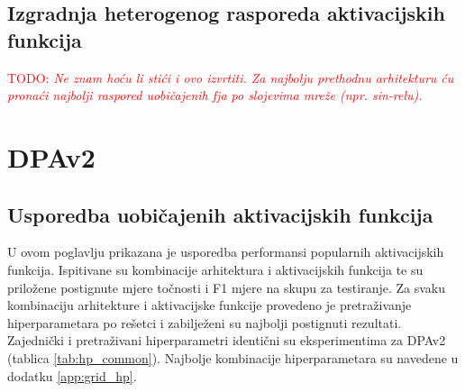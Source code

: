 \documentclass[times, utf8, numeric, diplomski]{fer}
\def\TODO#1{\noindent\textcolor{red}{TODO: \textit{#1}}\newline}
\def\todo#1{\TODO{#1}}
\begin{document}
\subsection{Izgradnja heterogenog rasporeda aktivacijskih funkcija}
\todo{Ne znam hoću li stići i ovo izvrtiti. Za najbolju prethodnu arhitekturu ću pronaći najbolji raspored uobičajenih fja po slojevima mreže (npr. sin-relu).}

\section{DPAv2}

\subsection{Usporedba uobičajenih aktivacijskih funkcija}

U ovom poglavlju prikazana je usporedba performansi popularnih aktivacijskih funkcija. Ispitivane su kombinacije arhitektura i aktivacijskih funkcija te su priložene postignute mjere točnosti i F1 mjere na skupu za testiranje. Za svaku kombinaciju arhitekture i aktivacijske funkcije provedeno je pretraživanje hiperparametara po rešetci i zabilježeni su najbolji postignuti rezultati. Zajednički i pretraživani hiperparametri identični su eksperimentima za DPAv2 (tablica \ref{tab:hp_common}). Najbolje kombinacije hiperparametara su navedene u dodatku \ref{app:grid_hp}.
\end{document}
